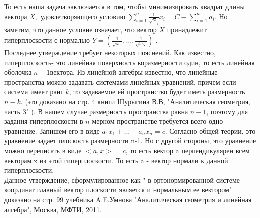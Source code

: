 \documentclass[12pt,a4paper]{article}
\begin{document}
То есть наша задача заключается в том, чтобы  минимизировать квадрат длины вектора $X, $ удовлетворяющего условию 
$\sum \limits_{i=1}^{n} \frac{1}{\sqrt \omega_i} x_i = C - \sum \limits_{i=1}^{n} a_i $. Но заметим, что данное условие означает, что вектор $X$ принадлежит гиперплоскости с нормалью $Y=(\frac{1}{\sqrt {\omega_1} }, \ldots, \frac{1}{\sqrt {\omega_N}} )$ .\\

Последнее утверждение требует некоторых пояснений. Как известно, гиперплоскость- это линейная поверхность коразмерности один, то есть линейная оболочка $ n-1 $вектора.  Из линейной алгебры известно, что линейные пространства можно задавать системами линейных уравнений, причем если система имеет ранг $ k$, то задаваемое ей пространство будет иметь размерность $n-k$.  (это доказано на стр. 4  книги Шурыгина В.В, "Аналитическая геометрия, часть 3" ). В нашем случае размерность пространства равна $n-1$, поэтому для задания  гиперплоскости в $n$-мерном пространстве  требуется всего одно уравнение. Запишем его в виде $a_1x_1 + \dots + a_nx_n=c$. Согласно общей теории, это уравнение задает плоскость размерности n-1. Но с другой стороны, это уравнение можно переписать в виде  $ <a,x> =c$, то есть вектор a перпендикулярен всем векторам x из этой гиперплоскости.  То есть a - вектор нормали к данной гиперплоскости.\\

Данное утверждение, сформулированное как  " в ортонормированной  системе координат главный вектор плоскости является и нормальным ее вектором" доказано на стр. 99  учебника A.E.Умнова "Аналитическая геометрия и линейная алгебра", Москва, МФТИ, 2011.\\
\end{document}
